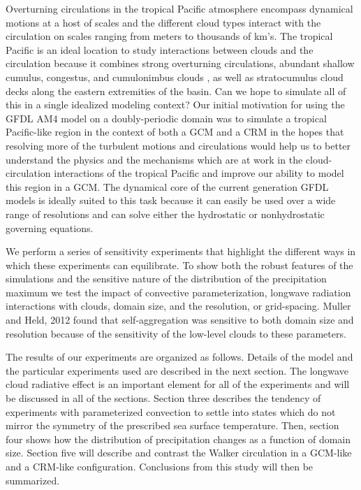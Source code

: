 \documentclass[draft]{agujournal2019}
\begin{document}
  Overturning circulations in the tropical Pacific atmosphere encompass dynamical motions at a host of scales 
and the different cloud types interact with the circulation on scales ranging from meters to thousands of km's.  
The tropical Pacific is an ideal location to study interactions between clouds and the circulation 
because it combines strong overturning circulations, abundant shallow cumulus, congestus, and cumulonimbus 
clouds \cite{Johnson1999}, as well as stratocumulus cloud decks along the eastern extremities of the basin.
Can we hope to simulate all of this in a single idealized modeling context?   Our initial motivation for using the 
GFDL AM4 model on a doubly-periodic domain was to simulate a tropical Pacific-like region 
in the context of both a GCM and a CRM in the hopes that resolving more of the turbulent motions and circulations
would help us to better understand the physics and the mechanisms which are at work in the cloud-circulation
interactions of the tropical Pacific and improve our ability to model this region in a GCM.    The dynamical core 
of the current generation GFDL models is ideally suited to this task because it can easily be used over a wide 
range of resolutions and can solve either the hydrostatic or nonhydrostatic governing equations.  

We perform a series of sensitivity experiments that highlight the different ways in which these experiments can equilibrate.  To 
show both the robust features of the simulations and the sensitive nature of the distribution of the precipitation maximum 
we test the impact of convective parameterization, 
longwave radiation interactions with clouds, domain size, 
and the resolution, or grid-spacing.    Muller and Held, 2012 found that self-aggregation was sensitive to both domain 
size and resolution because of the sensitivity of the low-level clouds to these parameters.  %

The results of our experiments are organized as follows.  Details of the model and the particular experiments used are described
in the next section.  The longwave cloud radiative effect is an important element for all of the experiments and will be 
discussed in all of the sections.   
Section three describes the tendency of experiments with parameterized convection to settle into states which 
do not mirror the symmetry of the prescribed sea surface temperature.   
Then, section four shows how the distribution of precipitation changes as a function of domain size.  
Section five will describe and contrast the Walker circulation in a GCM-like and a CRM-like configuration. 
Conclusions from this study will then be summarized.  
\end{document}

